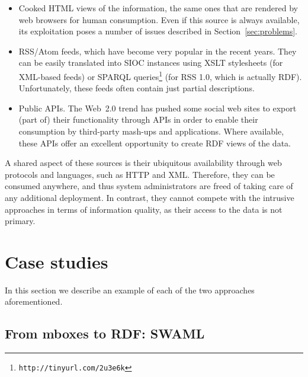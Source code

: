 \documentclass{../templates/www2008-submission}
\begin{document}
\begin{itemize}

\item Cooked HTML views of the information, the same ones that
are rendered by web browsers for human consumption. Even if this 
source is always available, its exploitation poses a number of 
issues described in Section~\ref{sec:problems}.

\item RSS/Atom feeds, which have become very popular in the recent years.
They can be easily
translated into SIOC instances using XSLT stylesheets (for XML-based feeds) or 
SPARQL queries\footnote{\texttt{http://tinyurl.com/2u3e6k}} (for RSS 1.0, 
which is actually RDF). Unfortunately, these feeds often contain just 
partial descriptions.

\item Public APIs. The Web~2.0 trend has pushed some social web
sites to export (part of) their functionality through APIs
in order to enable their consumption by third-party mash-ups and applications.
Where available, these APIs offer an excellent opportunity to
create RDF views of the data.

\end{itemize}

A shared aspect of these sources is their ubiquitous availability through
web protocols and languages, such as HTTP and XML. Therefore, they
can be consumed anywhere, and thus system administrators are freed of
taking care of any additional deployment. In contrast, they cannot compete
with the intrusive approaches in terms of information quality, as
their access to the data is not primary.


\section{Case studies}\label{sec:case-studies}

In this section we describe an example of each of the two approaches
aforementioned.

\subsection{From mboxes to RDF: SWAML}
\end{document}

